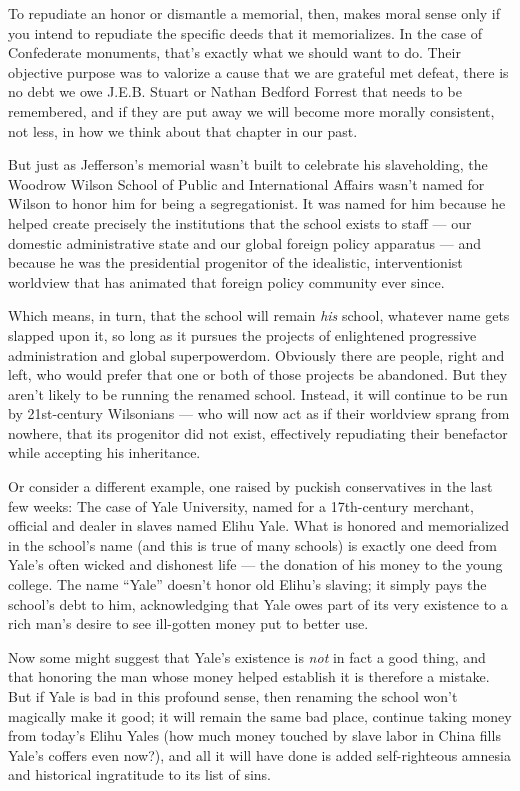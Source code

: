 To repudiate an honor or dismantle a memorial, then, makes moral sense
only if you intend to repudiate the specific deeds that it memorializes.
In the case of Confederate monuments, that's exactly what we should want
to do. Their objective purpose was to valorize a cause that we are
grateful met defeat, there is no debt we owe J.E.B. Stuart or Nathan
Bedford Forrest that needs to be remembered, and if they are put away we
will become more morally consistent, not less, in how we think about
that chapter in our past.

But just as Jefferson's memorial wasn't built to celebrate his
slaveholding, the Woodrow Wilson School of Public and International
Affairs wasn't named for Wilson to honor him for being a segregationist.
It was named for him because he helped create precisely the institutions
that the school exists to staff --- our domestic administrative state
and our global foreign policy apparatus --- and because he was the
presidential progenitor of the idealistic, interventionist worldview
that has animated that foreign policy community ever since.

Which means, in turn, that the school will remain \emph{his} school,
whatever name gets slapped upon it, so long as it pursues the projects
of enlightened progressive administration and global superpowerdom.
Obviously there are people, right and left, who would prefer that one or
both of those projects be abandoned. But they aren't likely to be
running the renamed school. Instead, it will continue to be run by
21st-century Wilsonians --- who will now act as if their worldview
sprang from nowhere, that its progenitor did not exist, effectively
repudiating their benefactor while accepting his inheritance.

Or consider a different example, one raised by puckish conservatives in
the last few weeks: The case of Yale University, named for a
17th-century merchant, official and dealer in slaves named Elihu Yale.
What is honored and memorialized in the school's name (and this is true
of many schools) is exactly one deed from Yale's often wicked and
dishonest life --- the donation of his money to the young college. The
name ``Yale'' doesn't honor old Elihu's slaving; it simply pays the
school's debt to him, acknowledging that Yale owes part of its very
existence to a rich man's desire to see ill-gotten money put to better
use.

Now some might suggest that Yale's existence is \emph{not} in fact a
good thing, and that honoring the man whose money helped establish it is
therefore a mistake. But if Yale is bad in this profound sense, then
renaming the school won't magically make it good; it will remain the
same bad place, continue taking money from today's Elihu Yales (how much
money touched by slave labor in China fills Yale's coffers even now?),
and all it will have done is added self-righteous amnesia and historical
ingratitude to its list of sins.

